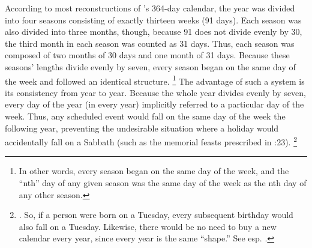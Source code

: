 According to most reconstructions of \jub's 364-day calendar, the year was divided into four seasons consisting of exactly thirteen weeks (91 days). Each season was also divided into three months, though, because 91 does not divide evenly by 30, the third month in each season was counted as 31 days. Thus, each season was composed of two months of 30 days and one month of 31 days. Because these seasons' lengths divide evenly by seven, every season began on the same day of the week and followed an identical structure.%
    \footnote{%
        In other words, every season began on the same day of the week, and the ``nth'' day of any given season was the same day of the week as the nth day of any other season.}
The advantage of such a system is its consistency from year to year. Because the whole year divides evenly by seven, every day of the year (in every year) implicitly referred to a particular day of the week. Thus, any scheduled event would fall on the same day of the week the following year, preventing the undesirable situation where a holiday would accidentally fall on a Sabbath (such as the memorial feasts prescribed in :23).%
    \footnote{%
        \Cite[233]{bergsma2007}. So, if a person were born on a Tuesday, every subsequent birthday would also fall on a Tuesday. Likewise, there would be no need to buy a new calendar every year, since every year is the same ``shape.'' See esp. 
        \cite[253]{jaubert_vt1953}.}

